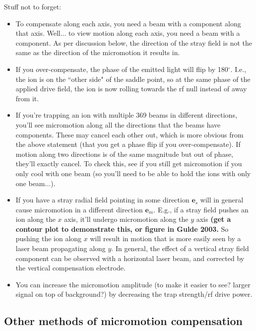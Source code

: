 \documentclass{article}
\begin{document}
Stuff not to forget:

\begin{itemize}
\item To compensate along each axis, you need a beam with a component along that axis. Well... to view motion along each axis, you need a beam with a component. As per discussion below, the direction of the stray field is not the same as the direction of the micromotion it results in.

\item If you over-compensate, the phase of the emitted light will flip by 180$^{\circ}$. I.e., the ion is on the ``other side" of the saddle point, so at the same phase of the applied drive field, the ion is now rolling towards the rf null instead of away from it.

\item If you're trapping an ion with multiple 369 beams in different directions, you'll see micromotion along all the directions that the beams have components. These may cancel each other out, which is more obvious from the above statement (that you get a phase flip if you over-compensate). If motion along two directions is of the same magnitude but out of phase, they'll exactly cancel. To check this, see if you still get micromotion if you only cool with one beam (so you'll need to be able to hold the ions with only one beam...).

\item If you have a stray radial field pointing in some direction $\mathbf{e}_s$ will in general cause micromotion in a different direction $\mathbf{e}_m$. E.g., if a stray field pushes an ion along the $x$ axis, it'll undergo micromotion along the $y$ axis \textbf{(get a contour plot to demonstrate this, or figure in Gulde 2003.} So pushing the ion along $x$ will result in motion that is more easily seen by a laser beam propagating along $y$. In general, the effect of a vertical stray field component can be observed with a horizontal laser beam, and corrected by the vertical compensation electrode.

\item You can increase the micromotion amplitude (to make it easier to see? larger signal on top of background?) by decreasing the trap strength/rf drive power.
\end{itemize}


\subsection*{Other methods of micromotion compensation}
\end{document}

